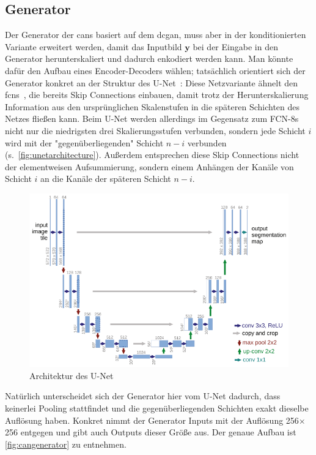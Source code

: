 \subsection{Generator}

Der Generator der \glspl{can} basiert auf dem \gls{dcgan}, muss aber in der konditionierten Variante erweitert werden, damit das Inputbild $ \mathbf{y} $ bei der Eingabe in den Generator herunterskaliert und dadurch enkodiert werden kann.
Man könnte dafür den Aufbau eines Encoder-Decoders wählen; tatsächlich orientiert sich der Generator konkret an der Struktur des U-Net~\cite{Ronneberger.2015}:
Diese Netzvariante ähnelt den \glspl{fcn}~\cite{Long.2015}, die bereits Skip Connections einbauen, damit trotz der Herunterskalierung Information aus den ursprünglichen Skalenstufen in die späteren Schichten des Netzes fließen kann.
Beim U-Net werden allerdings im Gegensatz zum FCN-8s nicht nur die niedrigsten drei Skalierungsstufen verbunden, sondern jede Schicht $ i $ wird mit der "gegenüberliegenden" Schicht $ n-i $ verbunden (s.~\autoref{fig:unetarchitecture}).
Außerdem entsprechen diese Skip Connections nicht der elementweisen Aufsummierung, sondern einem Anhängen der Kanäle von Schicht $ i $ an die Kanäle der späteren Schicht $ n-i $.

\begin{figure}
	\centering
	\includegraphics[width=\linewidth]{img/unet_architecture}
	\caption[Architektur des U-Net]{Architektur des U-Net~\cite{Ronneberger.2015}}
	\label{fig:unetarchitecture}
\end{figure}

Natürlich unterscheidet sich der Generator hier vom U-Net dadurch, dass keinerlei Pooling stattfindet und die gegenüberliegenden Schichten exakt dieselbe Auflösung haben.
Konkret nimmt der Generator Inputs mit der Auflösung 256$\times$256 entgegen und gibt auch Outputs dieser Größe aus.
Der genaue Aufbau ist \autoref{fig:cangenerator} zu entnehmen.

